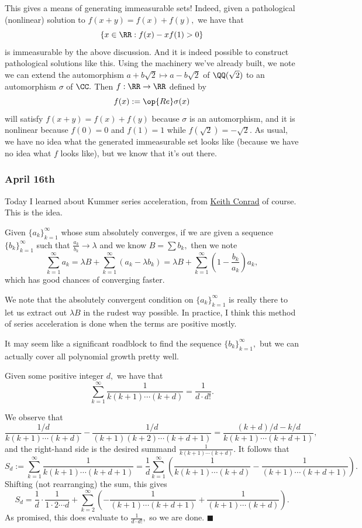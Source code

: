 This gives a means of generating immeasurable sets! Indeed, given a pathological (nonlinear) solution to $f(x+y)=f(x)+f(y),$ we have that
\[\{x\in\RR:f(x)-xf(1)>0\}\]
is immeasurable by the above discussion. And it is indeed possible to construct pathological solutions like this. Using the machinery we've already built, we note we can extend the automorphism $a+b\sqrt2\mapsto a-b\sqrt2$ of $\QQ(\sqrt2)$ to an automorphism $\sigma$ of $\CC.$ Then $f:\RR\to\RR$ defined by
\[f(x):=\op{Re}\sigma(x)\]
will satisfy $f(x+y)=f(x)+f(y)$ because $\sigma$ is an automorphism, and it is nonlinear because $f(0)=0$ and $f(1)=1$ while $f(\sqrt2)=-\sqrt2.$ As usual, we have no idea what the generated immeasurable set looks like (because we have no idea what $f$ looks like), but we know that it's out there.

\subsubsection{April 16th}
Today I learned about Kummer series acceleration, from \href{https://web.archive.org/web/20210117032227/https://kconrad.math.uconn.edu/blurbs/analysis/series_acceleration.pdf}{Keith Conrad} of course. This is the idea.
\begin{definition}
    Given $\{a_k\}_{k=1}^\infty$ whose sum absolutely converges, if we are given a sequence $\{b_k\}_{k=1}^\infty$ such that $\frac{a_k}{b_k}\to\lambda$ and we know $B=\sum b_k,$ then we note
    \[\sum_{k=1}^\infty a_k=\lambda B+\sum_{k=1}^\infty(a_k-\lambda b_k)=\lambda B+\sum_{k=1}^\infty\left(1-\frac{b_k}{a_k}\right)a_k,\]
    which has good chances of converging faster.
\end{definition}
We note that the absolutely convergent condition on $\{a_k\}_{k=1}^\infty$ is really there to let us extract out $\lambda B$ in the rudest way possible. In practice, I think this method of series acceleration is done when the terms are positive mostly.

It may seem like a significant roadblock to find the sequence $\{b_k\}_{k=1}^\infty,$ but we can actually cover all polynomial growth pretty well.
\begin{lemma}
    Given some positive integer $d,$ we have that
    \[\sum_{k=1}^\infty\frac1{k(k+1)\cdots(k+d)}=\frac1{d\cdot d!}.\]
\end{lemma}
We observe that
\[\frac{1/d}{k(k+1)\cdots(k+d)}-\frac{1/d}{(k+1)(k+2)\cdots(k+d+1)}=\frac{(k+d)/d-k/d}{k(k+1)\cdots(k+d+1)},\]
and the right-hand side is the desired summand $\frac1{k(k+1)\cdots(k+d)}.$ It follows that
\[S_d:=\sum_{k=1}^\infty\frac1{k(k+1)\cdots(k+d+1)}=\frac1d\sum_{k=1}^\infty\left(\frac1{k(k+1)\cdots(k+d)}-\frac1{(k+1)\cdots(k+d+1)}\right).\]
Shifting (not rearranging) the sum, this gives
\[S_d=\frac1d\cdot\frac1{1\cdot2\cdots d}+\sum_{k=2}^\infty\left(-\frac1{(k+1)\cdots(k+d+1)}+\frac1{(k+1)\cdots(k+d)}\right).\]
As promised, this does evaluate to $\frac1{d\cdot d!},$ so we are done. $\blacksquare$

